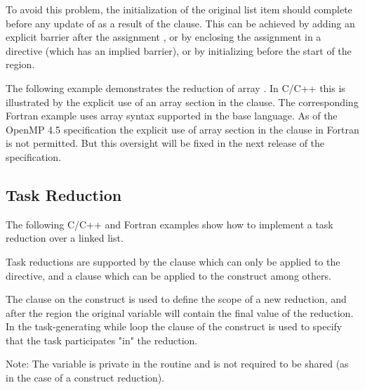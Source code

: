 To avoid this problem, the initialization of the original list item  
should complete before any update of  as a result of the  
clause. This can be achieved by adding an explicit barrier after the assignment 
, or by enclosing the assignment  in a  
directive (which has an implied barrier), or by initializing  before 
the start of the  region.



The following example demonstrates the reduction of array .  In C/C++ this is illustrated by the explicit use of an array section  in the  clause.  The corresponding Fortran example uses array syntax supported in the base language.  As of the OpenMP 4.5 specification the explicit use of array section in the  clause in Fortran is not permitted.  But this oversight will be fixed in the next release of the specification.





\subsection{Task Reduction}
\label{subsec:task_reduction}

The following C/C++ and Fortran examples show how to implement 
a task reduction over a linked list.

Task reductions are supported by the  clause which can only be
applied to the  directive, and a  clause
which can be applied to the  construct among others.

The  clause on the  construct is used to 
define the scope of a new reduction, and after the  
region the original variable will contain the final value of the reduction.
In the task-generating while loop the  clause of the 
construct is used to specify that the task participates "in" the reduction.

Note: The  variable is private in the  routine
and is not required to be shared (as in the case of a  construct
reduction).



